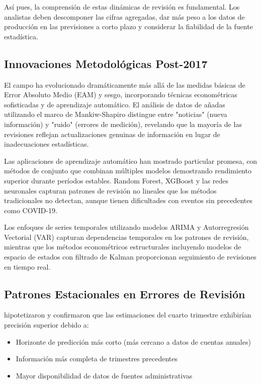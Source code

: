 \documentclass{article}
\begin{document}
Así pues, la comprensión de estas dinámicas de revisión es fundamental. Los analistas deben descomponer las cifras agregadas, dar más peso a los datos de producción en las previsiones a corto plazo y considerar la fiabilidad de la fuente estadística.


\subsection{Innovaciones Metodológicas Post-2017}

El campo ha evolucionado dramáticamente más allá de las medidas básicas de Error Absoluto Medio (EAM) y sesgo, incorporando técnicas econométricas sofisticadas y de aprendizaje automático. El análisis de datos de añadas utilizando el marco de Mankiw-Shapiro distingue entre "noticias" (nueva información) y "ruido" (errores de medición), revelando que la mayoría de las revisiones reflejan actualizaciones genuinas de información en lugar de inadecuaciones estadísticas.

Las aplicaciones de aprendizaje automático han mostrado particular promesa, con métodos de conjunto que combinan múltiples modelos demostrando rendimiento superior durante períodos estables. Random Forest, XGBoost y las redes neuronales capturan patrones de revisión no lineales que los métodos tradicionales no detectan, aunque tienen dificultades con eventos sin precedentes como COVID-19.

Los enfoques de series temporales utilizando modelos ARIMA y Autorregresión Vectorial (VAR) capturan dependencias temporales en los patrones de revisión, mientras que los métodos econométricos estructurales incluyendo modelos de espacio de estados con filtrado de Kalman proporcionan seguimiento de revisiones en tiempo real.

\subsection{Patrones Estacionales en Errores de Revisión}

\citet{pavia2017} hipotetizaron y confirmaron que las estimaciones del cuarto trimestre exhibirían precisión superior debido a:

\begin{itemize}
\item Horizonte de predicción más corto (más cercano a datos de cuentas anuales)
\item Información más completa de trimestres precedentes
\item Mayor disponibilidad de datos de fuentes administrativas
\end{itemize}
\end{document}
